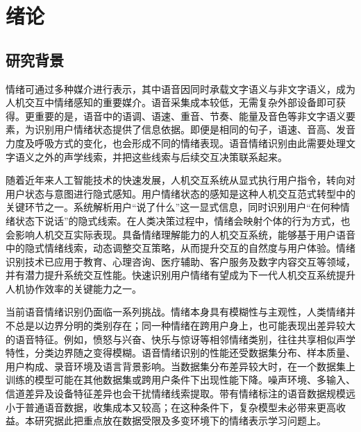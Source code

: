 \chapter{绪论}


\section{研究背景}

情绪可通过多种媒介进行表示，其中语音因同时承载文字语义与非文字语义，成为人机交互中情绪感知的重要媒介\cite{shou2026comprehensive,hou2022multi}。语音采集成本较低，无需复杂外部设备即可获得。更重要的是，语音中的语调、语速、重音、节奏、能量及音色等非文字语义要素，为识别用户情绪状态提供了信息依据。即便是相同的句子，语速、音高、发音力度及呼吸方式的变化，也会形成不同的情绪表现。语音情绪识别由此需要处理文字语义之外的声学线索，并把这些线索与后续交互决策联系起来。

随着近年来人工智能技术的快速发展，人机交互系统从显式执行用户指令，转向对用户状态与意图进行隐式感知\cite{ma2023review,raamkumar2023empathetic}。用户情绪状态的感知是这种人机交互范式转型中的关键环节之一。系统解析用户“说了什么”这一显式信息，同时识别用户“在何种情绪状态下说话”的隐式线索。在人类决策过程中，情绪会映射个体的行为方式，也会影响人机交互实际表现。具备情绪理解能力的人机交互系统，能够基于用户语音中的隐式情绪线索，动态调整交互策略，从而提升交互的自然度与用户体验。情绪识别技术已应用于教育、心理咨询、医疗辅助、客户服务及数字内容交互等领域，并有潜力提升系统交互性能。快速识别用户情绪有望成为下一代人机交互系统提升人机协作效率的关键能力之一。

当前语音情绪识别仍面临一系列挑战。情绪本身具有模糊性与主观性，人类情绪并不总是以边界分明的类别存在；同一种情绪在跨用户身上，也可能表现出差异较大的语音特征。例如，愤怒与兴奋、快乐与惊讶等相邻情绪类别，往往共享相似声学特性，分类边界随之变得模糊。语音情绪识别的性能还受数据集分布、样本质量、用户构成、录音环境及语言背景影响。当数据集分布差异较大时，在一个数据集上训练的模型可能在其他数据集或跨用户条件下出现性能下降。噪声环境、多输入、信道差异及设备特征差异也会干扰情绪线索提取。带有情绪标注的语音数据规模远小于普通语音数据，收集成本又较高；在这种条件下，复杂模型未必带来更高收益。本研究据此把重点放在数据受限及多变环境下的情绪表示学习问题上。

